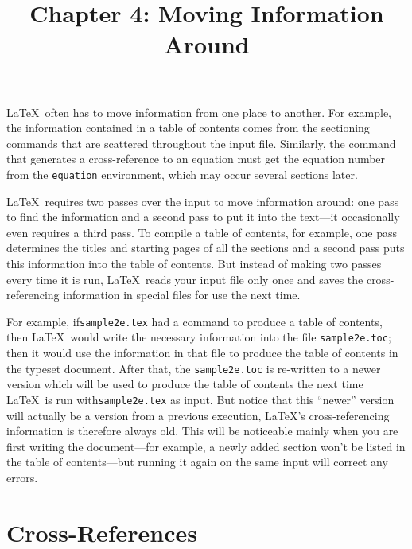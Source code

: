 \documentclass{article}
\title{Chapter 4: Moving Information Around} %
\author{}
\date{}
\begin{document}

\maketitle %

\LaTeX\ often has to move information from one place to another. For example, the information
contained in a table of contents comes from the sectioning commands that are scattered throughout
the input file. Similarly, the command that generates a cross-reference to an equation must get the
equation number from the {\tt equation} environment, which may occur several sections later. 

\LaTeX\ requires two passes over the input to move information around: one pass to find the
information and a second pass to put it into the text—it occasionally even requires a third pass. To
compile a table of contents, for example, one pass determines the titles and starting pages of all
the sections and a second pass puts this information into the table of contents. But instead of
making two passes every time it is run, \LaTeX\ reads your input file only once and saves the
cross-referencing information in special files for use the next time. 

For example, if{\tt sample2e.tex} had a command to produce a table of contents, then \LaTeX\ would
write the necessary information into the file {\tt sample2e.toc}; then it would use the information
in that file to produce the table of contents in the typeset document. After that, the
{\tt sample2e.toc} is re-written to a newer version which will be used to produce the table of
contents the next time \LaTeX\ is run with{\tt sample2e.tex} as input. But notice that this
``newer'' version will actually be a version from a previous execution, \LaTeX's cross-referencing
information is therefore always old. This will be noticeable mainly when you are first writing the
document—for example, a newly added section won't be listed in the table of contents—but running it
again on the same input will correct any errors.

\section{Cross-References}
\end{document}
